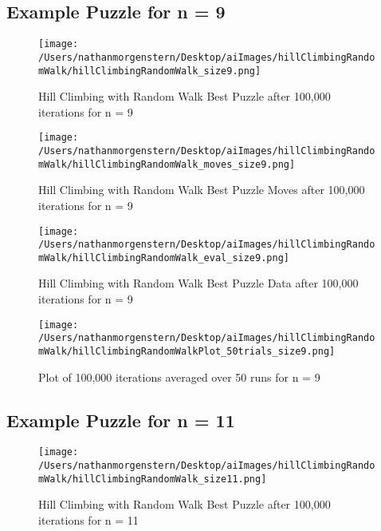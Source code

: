 \documentclass{report}
\begin{document}
\subsection{Example Puzzle for n = 9}

	\begin{figure}[H]
	\centering
	\texttt{[image: /Users/nathanmorgenstern/Desktop/aiImages/hillClimbingRandomWalk/hillClimbingRandomWalk\_size9.png]}
	\caption{Hill Climbing with Random Walk Best Puzzle after 100,000 iterations for n = 9} 
	\label{fig: Hill Climbing with Random Walk Best Puzzle after 100,000 iterations for n = 9}
	\end{figure}
	
	\begin{figure}[H]
	\centering
	\texttt{[image: /Users/nathanmorgenstern/Desktop/aiImages/hillClimbingRandomWalk/hillClimbingRandomWalk\_moves\_size9.png]}
	\caption{Hill Climbing with Random Walk Best Puzzle Moves after 100,000 iterations for n = 9} 
	\label{fig: Hill Climbing with Random Walk Best Puzzle Moves after 100,000 iterations for n = 9}
	\end{figure}

	\begin{figure}[H]
	\centering
	\texttt{[image: /Users/nathanmorgenstern/Desktop/aiImages/hillClimbingRandomWalk/hillClimbingRandomWalk\_eval\_size9.png]}
	\caption{Hill Climbing with Random Walk Best Puzzle Data after 100,000 iterations for n = 9} 
	\label{fig: Hill Climbing with Random Walk Best Puzzle Data after 100,000 iterations for n = 9}
	\end{figure}

	\begin{figure}[H]
	\centering
	\texttt{[image: /Users/nathanmorgenstern/Desktop/aiImages/hillClimbingRandomWalk/hillClimbingRandomWalkPlot\_50trials\_size9.png]}
	\caption{Plot of 100,000 iterations averaged over 50 runs for n = 9}
	\label{fig: Plot of 100,000 iterations averaged over 50 runs for n = 9}
	\end{figure}
	
\subsection{Example Puzzle for n = 11}

	\begin{figure}[H]
	\centering
	\texttt{[image: /Users/nathanmorgenstern/Desktop/aiImages/hillClimbingRandomWalk/hillClimbingRandomWalk\_size11.png]}
	\caption{Hill Climbing with Random Walk Best Puzzle after 100,000 iterations for n = 11} 
	\label{fig: Hill Climbing with Random Walk Best Puzzle after 100,000 iterations for n = 11}
	\end{figure}
	
\end{document}
